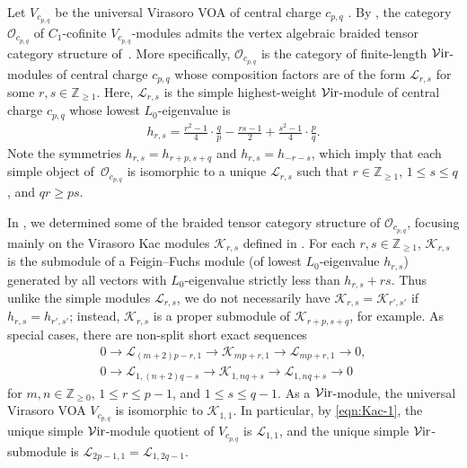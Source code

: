\documentclass[pdftex]{sigma}
\numberwithin{equation}{section}
\theoremstyle{definition}
\begin{document}
Let $V_{c_{p,q}}$ be the universal Virasoro VOA of central charge $c_{p,q}$ \cite{Frenkel-YZhu}. By \cite{CJORY}, the category~$\mathcal{O}_{c_{p,q}}$ of $C_1$-cofinite $V_{c_{p,q}}$-modules admits the vertex algebraic braided tensor category structure of~\cite{HLZ1,HLZ2,HLZ3,HLZ4,HLZ5,HLZ6,HLZ7,HLZ8}. More specifically, $\mathcal{O}_{c_{p,q}}$ is the category of finite-length $\mathcal{V}{\rm ir}$-modules of central charge $c_{p,q}$ whose composition factors are of the form $\mathcal{L}_{r,s}$ for some $r,s\in\mathbb{Z}_{\geq 1}$. Here, $\mathcal{L}_{r,s}$ is the simple highest-weight $\mathcal{V}{\rm ir}$-module of central charge $c_{p,q}$ whose lowest $L_0$-eigenvalue is
\begin{gather*}
h_{r,s} =\frac{r^2-1}{4}\cdot\frac{q}{p}-\frac{rs-1}{2}+\frac{s^2-1}{4}\cdot\frac{p}{q}.
\end{gather*}
Note the symmetries $h_{r,s}=h_{r+p,s+q}$ and $h_{r,s}=h_{-r-s}$, which imply that each simple object of~$\mathcal{O}_{c_{p,q}}$ is isomorphic to a unique $\mathcal{L}_{r,s}$ such that $r\in\mathbb{Z}_{\geq 1}$, $1\leq s\leq q$, and $qr\geq ps$.

In \cite{MS-cpq-Vir}, we determined some of the braided tensor category structure of $\mathcal{O}_{c_{p,q}}$, focusing mainly on the Virasoro Kac modules $\mathcal{K}_{r,s}$ defined in \cite{MDRR}. For each $r,s\in\mathbb{Z}_{\geq 1}$, $\mathcal{K}_{r,s}$ is the submodule of a Feigin--Fuchs module \cite{Feigin--Fuchs} (of lowest $L_0$-eigenvalue $h_{r,s}$) generated by all vectors with $L_0$-eigenvalue strictly less than $h_{r,s}+rs$. Thus unlike the simple modules $\mathcal{L}_{r,s}$, we do not necessarily have $\mathcal{K}_{r,s} = \mathcal{K}_{r',s'}$ if $h_{r,s}=h_{r',s'}$; instead, $\mathcal{K}_{r,s}$ is a proper submodule of $\mathcal{K}_{r+p,s+q}$, for example.
As special cases, there are non-split short exact sequences
\begin{gather}
0\longrightarrow \mathcal{L}_{(m+2)p-r,1} \longrightarrow \mathcal{K}_{mp+r,1} \longrightarrow \mathcal{L}_{mp+r,1} \longrightarrow 0,\nonumber\\
0\longrightarrow \mathcal{L}_{1,(n+2)q-s}\longrightarrow \mathcal{K}_{1,nq+s} \longrightarrow \mathcal{L}_{1,nq+s}\longrightarrow 0\label{eqn:Kac-1}
\end{gather}
for $m,n\in\mathbb{Z}_{\geq 0}$, $1\leq r\leq p-1$, and $1\leq s\leq q-1$.
As a $\mathcal{V}{\rm ir}$-module, the universal Virasoro VOA $V_{c_{p,q}}$ is isomorphic to $\mathcal{K}_{1,1}$.
In particular, by \eqref{eqn:Kac-1}, the unique simple $\mathcal{V}{\rm ir}$-module quotient of $V_{c_{p,q}}$ is $\mathcal{L}_{1,1}$, and the unique simple $\mathcal{V}{\rm ir}$-submodule is $\mathcal{L}_{2p-1,1}=\mathcal{L}_{1,2q-1}$.
\end{document}

